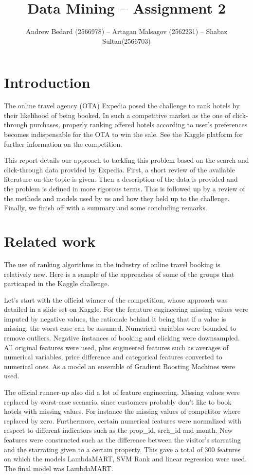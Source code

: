 \documentclass{llncs}
\title{Data Mining -- Assignment 2}
\author{Andrew Bedard (2566978) -- Artagan Malsagov (2562231)  -- Shabaz Sultan(2566703)}
\institute{}
\begin{document}
\maketitle
\section{Introduction}
The online travel agency (OTA) Expedia posed the challenge to rank hotels by their likelihood of being booked. In such a competitive market as the one of click-through purchases, properly ranking offered hotels according to user's preferences becomes indispensable for the OTA to win the sale. See the Kaggle platform \cite{WinNT} for further information on the competition.

This report details our approach to tackling this problem based on the search and click-through data provided by Expedia. First, a short review of the available literature on the topic is given. Then a description of the data is provided and the problem is defined in more rigorous terms. This is followed up by a review of the methods and models used by us and how they held up to the challenge. Finally, we finish off with a summary and some concluding remarks.  

\section{Related work}
The use of ranking algorithms in the industry of online travel booking is relatively new. Here is a sample of the approaches of some of the groups that particaped in the Kaggle challenge.

Let's start with the official winner of the competition, whose approach was detailed in a slide set on Kaggle. For the feauture engineering missing values were imputed by negative values, the rationale behind it being that if a value is missing, the worst case can be assumed. Numerical variables were bounded to remove outliers. Negative instances of booking and clicking were downsampled. All original features were used, plus engineered features such as averages of numerical variables, price difference and categorical features converted to numerical ones. As a model an ensemble of Gradient Boosting Machines were used. 

The official runner-up also did a lot of feature engineering. Missing values were replaced by worst-case scenario, since customers probably don't like to book hotels with missing values. For instance the missing values of competitor where replaced by zero. Furthermore, certain numerical features were normalized with respect to different indicators such as the prop\_id, srch\_id and month. New features were constructed such as the difference between the visitor's starrating and the starrating given to a certain property. This gave a total of 300 features on which the models LambdaMART, SVM Rank and linear regression were used. The final model was LambdaMART.
\end{document}
